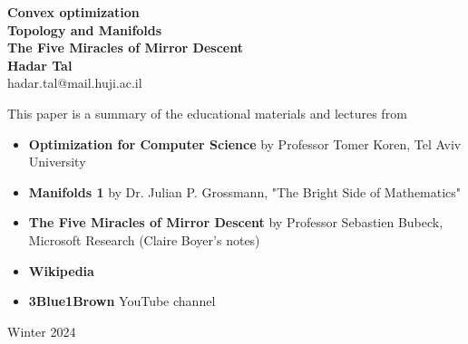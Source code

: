 \documentclass[11pt]{book} %
\begin{document}
\begin{titlepage}
    \begin{center}
     {\huge\bfseries 
     Convex optimization \\
     Topology and Manifolds \\
     The Five Miracles of Mirror Descent \\}
     \vspace{1.5cm}
     {\Large\bfseries Hadar Tal}\\[5pt]
     hadar.tal@mail.huji.ac.il\\[14pt]
     \vspace{2cm}
     {This paper is a summary of the educational materials and lectures from 
     \begin{itemize}
        \item \textbf{Optimization for Computer Science} by Professor Tomer Koren, Tel Aviv University
        \item \textbf{Manifolds 1} by Dr. Julian P. Grossmann, "The Bright Side of Mathematics" 
        \item \textbf{The Five Miracles of Mirror Descent} by Professor Sebastien Bubeck, Microsoft Research (Claire Boyer's notes)
        \item \textbf{Wikipedia}
        \item \textbf{3Blue1Brown} YouTube channel
     \end{itemize}
     }

     \vfill
    {Winter 2024}
    \end{center}
\end{titlepage}


\frontmatter
\tableofcontents

\end{document}
